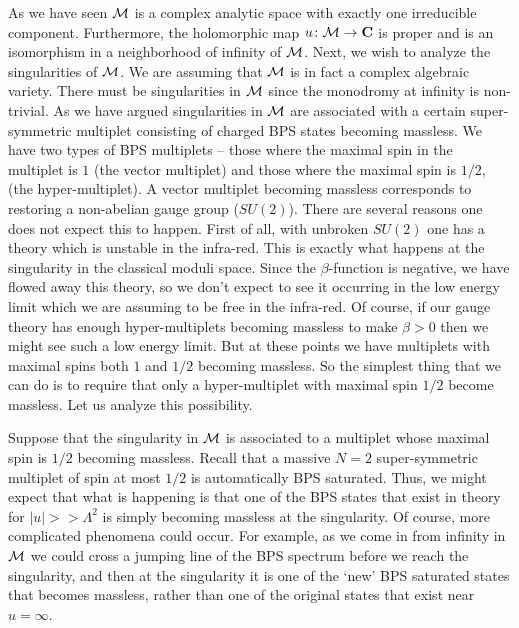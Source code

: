 \documentclass[10pt]{article}
\begin{document}
As we have seen ${\cal M}$ is a complex analytic space with  exactly
one irreducible component. Furthermore, the holomorphic map 
$u\colon {\cal M}\to {\bf C}$ is proper and is an isomorphism in a
neighborhood of infinity of ${\cal M}$.  Next, we wish to analyze the
singularities of ${\cal M}$. We are assuming that ${\cal M}$ is in
fact a complex algebraic variety.  There must be singularities in ${\cal M}$
since the monodromy at infinity is non-trivial. As we have argued
singularities in ${\cal M}$ are associated with a certain
super-symmetric multiplet consisting of charged BPS
states becoming massless.  We have two types of BPS multiplets -- those
where the maximal spin in the multiplet is $1$ (the vector multiplet)
and those where the 
maximal spin is $1/2$, (the hyper-multiplet).  A vector multiplet
becoming massless corresponds to 
restoring a non-abelian gauge group ($SU(2)$). There are several
reasons one does not expect this to happen.  First of all, 
with unbroken $SU(2)$ one has
a theory which is unstable in the infra-red. This is exactly
what happens at the
singularity in the classical moduli space.
Since the $\beta$-function is
negative, we have flowed away this theory, so we don't expect to see it
occurring in the low energy limit which we are assuming to be free in
the infra-red. Of course, if our gauge theory has
enough hyper-multiplets becoming massless to make $\beta>0$ then we
might see such a low energy limit.  But at these points we have 
multiplets with   
maximal spins both $1$ and $1/2$ becoming massless. So the simplest
thing that we can do is to require that only a hyper-multiplet with
maximal spin $1/2$  become massless.
Let us analyze this possibility.


Suppose that the singularity in ${\cal M}$ is associated to a
multiplet whose maximal spin is $1/2$ becoming massless. Recall that a
massive $N=2$
super-symmetric multiplet of spin at most $1/2$ is automatically BPS
saturated. Thus, we might expect that what is happening is that one of
the BPS states that exist in theory for $|u|>>\Lambda^2$ is simply becoming
massless at the 
singularity.  Of course, more complicated phenomena could occur.  For
example, as we come in from infinity in ${\cal M}$ we could cross a
jumping line of the BPS spectrum before we reach the singularity, and
then at the singularity it is one of the `new' BPS saturated states
that becomes massless, rather than one of the original states that
exist near $u=\infty$.
\end{document}
